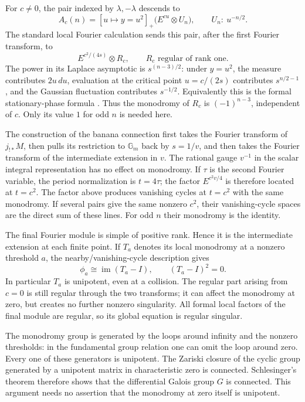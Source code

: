 \documentclass[11pt,a4paper]{article}
\theoremstyle{definition}
\theoremstyle{remark}
\numberwithin{equation}{section}
\begin{document}
For $c\ne0$, the pair indexed by $\lambda,-\lambda$ descends to
\[
 A_c(n)=[u\mapsto y=u^2]_+
                    \bigl(E^{cu}\otimes U_n\bigr),
 \qquad U_n:\ u^{-n/2}.
\]
The standard local Fourier calculation sends this pair, after the
first Fourier transform, to
\[
 E^{c^2/(4s)}\otimes R_c,
 \qquad R_c\text{ regular of rank one}.
\]
The power in its Laplace asymptotic is $s^{(n-3)/2}$: under
$y=u^2$, the measure contributes $2u\,du$, evaluation at the
critical point $u=c/(2s)$ contributes $s^{n/2-1}$, and the
Gaussian fluctuation contributes $s^{-1/2}$. Equivalently this
is the formal stationary-phase formula
\cite{p5:BG_Sabbah2008,p5:BG_GarciaLopez2004}.
Thus the monodromy of $R_c$ is $(-1)^{n-3}$, independent of $c$.
Only its value $1$ for odd $n$ is needed here.

The construction of the banana connection first takes the Fourier
transform of $j_{!*}M$, then pulls its restriction to $\mathbb G_m$
back by $s=1/v$, and then takes the Fourier transform of the
intermediate extension in $v$. The rational gauge $v^{-1}$ in
the scalar integral representation has no effect on monodromy.
If $\tau$ is the second Fourier variable, the period normalization is
$t=4\tau$; the factor $E^{c^2v/4}$ is therefore located at $t=c^2$.
The factor above produces vanishing cycles at
$t=c^2$ with the same monodromy. If several pairs give the same
nonzero $c^2$, their vanishing-cycle spaces are the direct sum of
these lines. For odd $n$ their monodromy is the identity.

The final Fourier module is simple of positive rank. Hence it is
the intermediate extension at each finite point. If $T_a$ denotes
its local monodromy at a nonzero threshold $a$, the
nearby/vanishing-cycle description gives
\[
        \phi_a\cong\operatorname{im}(T_a-I),
        \qquad (T_a-I)^2=0.
\]
In particular $T_a$ is unipotent, even at a collision. The regular
part arising from $c=0$ is still regular through the two transforms;
it can affect the monodromy at zero, but creates no further nonzero
singularity. All formal local factors of the final module are regular,
so its global equation is regular singular.

The monodromy group is generated by the loops around infinity and
the nonzero thresholds: in the fundamental group relation one can
omit the loop around zero. Every one of these generators is
unipotent. The Zariski closure of the cyclic group generated by a
unipotent matrix in characteristic zero is connected. Schlesinger's
theorem therefore shows that the differential Galois group $G$ is
connected. This argument needs no assertion that the monodromy at
zero itself is unipotent.
\end{document}
